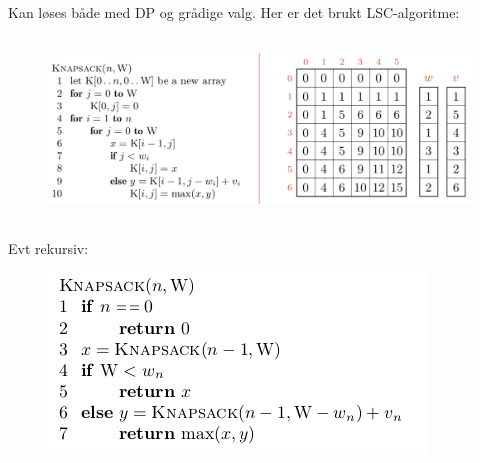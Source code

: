 \documentclass[12pt]{report}
\begin{document}
Kan løses både med DP og grådige valg. Her er det brukt LSC-algoritme:\par




\begin{figure}[H]
	\begin{Center}
		\includegraphics[width=5.36in,height=1.91in]{./media/image57.png}
	\end{Center}
\end{figure}



\par


\vspace{\baselineskip}
Evt rekursiv:\par




\begin{figure}[H]
	\begin{Center}
		\includegraphics[width=3.96in,height=1.91in]{./media/image58.png}
	\end{Center}
\end{figure}



\par
\end{document}
